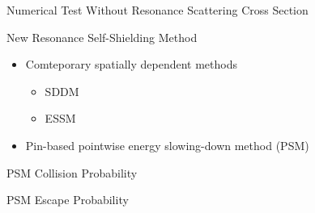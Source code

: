 \documentclass[sans,mathserif,aspectratio=169, 10pt]{beamer}
\begin{document}
\begin{frame}{Numerical Test Without Resonance Scattering Cross Section}
\centering
{}
\end{frame}

\begin{frame}{New Resonance Self-Shielding Method}
\begin{itemize}
\item Comteporary spatially dependent methods
	\begin{itemize}
	\item SDDM
	\item ESSM
	\end{itemize}
\item Pin-based pointwise energy slowing-down method (PSM)
\end{itemize}
\end{frame}

\begin{frame}{PSM Collision Probability}
\centering
{}
\end{frame}

\begin{frame}{PSM Escape Probability}
\centering
{}
\end{frame}
\end{document}
